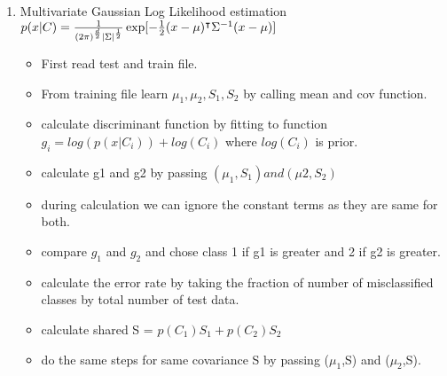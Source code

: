 \documentclass[]{report}
\DeclarePairedDelimiter{\abs}{\lvert}{\rvert}
\begin{document}
\begin{enumerate}
	\item Multivariate Gaussian Log Likelihood estimation\\
	$p(x|C) = \frac{1}{(2\pi)^\frac{d}{2}\abs{\Sigma}^\frac{1}{2}}\exp[-\frac{1}{2}(x-\mu)^\intercal \Sigma^{-1} (x-\mu)]$\\
	\begin{itemize}
		\item First read test and train file.
		\item From training file learn $\mu_{1},\mu_{2},S_{1},S_{2}$ by calling mean and cov function.
		\item calculate discriminant function by fitting to function \\
		 $g_{i} = log(p(x|C_{i})) + log(C_{i})$ where $log(C_{i})$ is prior.
		\item calculate g1 and g2 by passing $(\mu_{1},S_{1}) and (\mu2,S_{2})$ 
		\item during calculation we can ignore the constant terms as they are same for both.
		\item compare $g_{1}$ and $g_{2}$ and chose class 1 if g1 is greater and 2 if g2 is greater. 
		\item calculate the error rate by taking the fraction of number of misclassified classes by total number of test data.
		\item calculate shared S = $p(C_{1})S_{1}+p(C_{2})S_{2}$
		\item do the same steps for same covariance S by passing ($\mu_{1}$,S) and ($\mu_{2}$,S).
	\end{itemize}
\end{enumerate}
\end{document}
